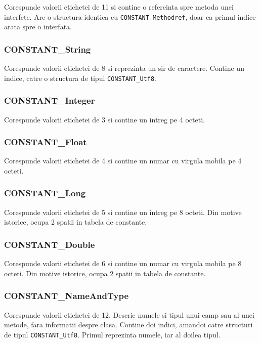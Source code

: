 Corespunde valorii etichetei de 11 si contine o refereinta spre metoda
unei interfete. Are o structura identica cu
\texttt{CONSTANT\_Methodref}, doar ca primul indice arata spre o
interfata.

\subsubsection{CONSTANT\_String}

Corespunde valorii etichetei de 8 si reprezinta un sir de caractere.
Contine un indice, catre o structura de tipul \texttt{CONSTANT\_Utf8}.

\subsubsection{CONSTANT\_Integer}

Corespunde valorii etichetei de 3 si contine un intreg pe 4 octeti.

\subsubsection{CONSTANT\_Float}

Corespunde valorii etichetei de 4 si contine un numar cu virgula mobila
pe 4 octeti.

\subsubsection{CONSTANT\_Long}

Corespunde valorii etichetei de 5 si contine un intreg pe 8 octeti. Din
motive istorice, ocupa 2 spatii in tabela de constante.

\subsubsection{CONSTANT\_Double}

Corespunde valorii etichetei de 6 si contine un numar cu virgula mobila
pe 8 octeti. Din motive istorice, ocupa 2 spatii in tabela de constante.

\subsubsection{CONSTANT\_NameAndType}

Corespunde valorii etichetei de 12. Descrie numele si tipul unui camp
sau al unei metode, fara informatii despre clasa. Contine doi indici,
amandoi catre structuri de tipul \texttt{CONSTANT\_Utf8}. Primul
reprezinta numele, iar al doilea tipul.

